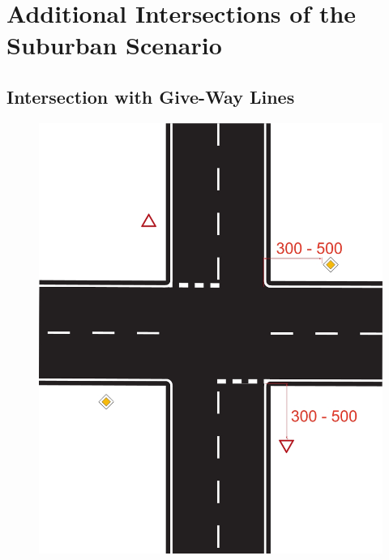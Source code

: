 \section{Additional Intersections of the Suburban Scenario}
\label{additional_intersections}

\subsection{Intersection with Give-Way Lines}
\label{fig_intersection_give_way_lines}
\begin{figure}[H]
	\begin{center}
		\centering\includegraphics[]{graphics/Abb_12_intersection_give_way_lines.jpg}
	\end{center}
\end{figure}

